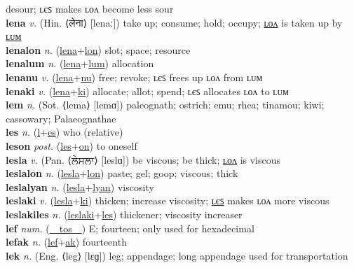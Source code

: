 desour; ʟєꜱ makes ʟᴏᴧ become less sour \label{leneki} \\
\textbf{lena} \textit{v.} (Hin. ⟨लेना⟩ [lenaː])
take up; consume; hold; occupy; \hyperref[lenalon]{ʟᴏᴧ} is taken up by \hyperref[lenalum]{ʟᴜᴍ} \label{lena} \\
\textbf{lenalon} \textit{n.} (\hyperref[lena]{lena}+\hyperref[lon]{lon})
slot; space; resource \label{lenalon} \\
\textbf{lenalum} \textit{n.} (\hyperref[lena]{lena}+\hyperref[lum]{lum})
allocation \label{lenalum} \\
\textbf{lenanu} \textit{v.} (\hyperref[lena]{lena}+\hyperref[nu]{nu})
free; revoke; ʟєꜱ frees up ʟᴏᴧ from ʟᴜᴍ \label{lenanu} \\
\textbf{lenaki} \textit{v.} (\hyperref[lena]{lena}+\hyperref[ki]{ki})
allocate; allot; spend; ʟєꜱ allocates ʟᴏᴧ to ʟᴜᴍ \label{lenaki} \\
\textbf{lem} \textit{n.} (Sot. ⟨lema⟩ [lemɑ])
paleognath; ostrich; emu; rhea; tinamou; kiwi; cassowary; Palaeognathae \label{lem} \\
\textbf{les} \textit{n.} (\hyperref[l]{l}+\hyperref[s]{es})
who (relative) \label{les} \\
\textbf{leson} \textit{post.} (\hyperref[les]{les}+\hyperref[on]{on})
to oneself \label{leson} \\
\textbf{lesla} \textit{v.} (Pan. ⟨ਲੇਸਲਾ⟩ [leslɑ])
be viscous; be thick; \hyperref[leslalon]{ʟᴏᴧ} is viscous \label{lesla} \\
\textbf{leslalon} \textit{n.} (\hyperref[lesla]{lesla}+\hyperref[lon]{lon})
paste; gel; goop; viscous; thick \label{leslalon} \\
\textbf{leslalyan} \textit{n.} (\hyperref[lesla]{lesla}+\hyperref[lyan]{lyan})
viscosity \label{leslalyan} \\
\textbf{leslaki} \textit{v.} (\hyperref[lesla]{lesla}+\hyperref[ki]{ki})
thicken; increase viscosity; \hyperref[leslakiles]{ʟєꜱ} makes ʟᴏᴧ more viscous \label{leslaki} \\
\textbf{leslakiles} \textit{n.} (\hyperref[leslaki]{leslaki}+\hyperref[les]{les})
thickener; viscosity increaser \label{leslakiles} \\
\textbf{lef} \textit{num.} (\hyperref[tos]{~~tos~~})
E; fourteen; only used for hexadecimal \label{lef} \\
\textbf{lefak} \textit{n.} (\hyperref[lef]{lef}+\hyperref[ak]{ak})
fourteenth \label{lefak} \\
\textbf{lek} \textit{n.} (Eng. ⟨leg⟩ [lɛɡ])
leg; appendage; long appendage used for transportation \label{lek} \\
